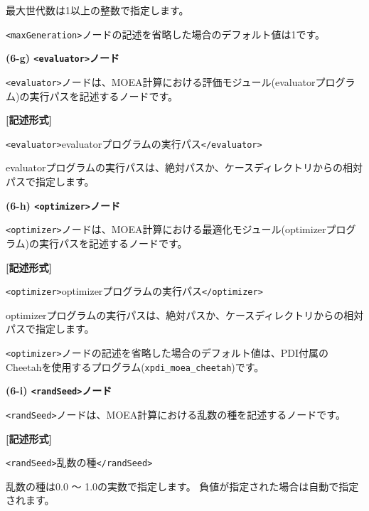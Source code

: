\documentclass[a4paper,11pt]{jarticle}
\begin{document}
{\vspace{8pt}
\leftskip=0pt
最大世代数は1以上の整数で指定します。

\texttt{<maxGeneration>}ノードの記述を省略した場合のデフォルト値は1です。


\vspace{12pt}
\textbf{(6-g) \texttt{<evaluator>}ノード}

\texttt{<evaluator>}ノードは、MOEA計算における評価モジュール(evaluatorプログラム)の実行パスを記述するノードです。

\vspace{8pt}
\leftskip=12pt
\textbf{[記述形式]}

\leftskip=42pt
\texttt{<evaluator>}evaluatorプログラムの実行パス\texttt{</evaluator>}

\vspace{8pt}
\leftskip=0pt
evaluatorプログラムの実行パスは、絶対パスか、ケースディレクトリからの相対パスで指定します。

\vspace{12pt}
\textbf{(6-h) \texttt{<optimizer>}ノード}

\texttt{<optimizer>}ノードは、MOEA計算における最適化モジュール(optimizerプログラム)の実行パスを記述するノードです。

\vspace{8pt}
\leftskip=12pt
\textbf{[記述形式]}

\leftskip=42pt
\texttt{<optimizer>}optimizerプログラムの実行パス\texttt{</optimizer>}

\vspace{8pt}
\leftskip=0pt
optimizerプログラムの実行パスは、絶対パスか、ケースディレクトリからの相対パスで指定します。

\texttt{<optimizer>}ノードの記述を省略した場合のデフォルト値は、PDI付属のCheetahを使用するプログラム({\tt xpdi\_moea\_cheetah})です。

\vspace{12pt}
\textbf{(6-i) \texttt{<randSeed>}ノード}

\texttt{<randSeed>}ノードは、MOEA計算における乱数の種を記述するノードです。

\vspace{8pt}
\leftskip=12pt
\textbf{[記述形式]}

\leftskip=42pt
\texttt{<randSeed>}乱数の種\texttt{</randSeed>}

\vspace{8pt}
\leftskip=0pt
乱数の種は0.0 〜 1.0の実数で指定します。
負値が指定された場合は自動で指定されます。

}
\end{document}
